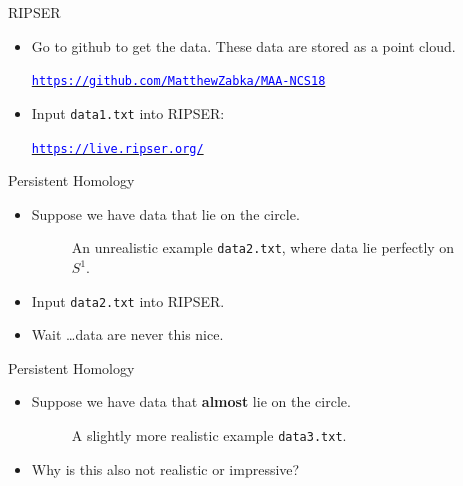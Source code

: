 \begin{frame}{RIPSER}
\begin{center}
\end{center}
\begin{itemize}
\item<1-> Go to github to get the data. These data are stored as a point cloud.
\begin{center}
\hyperref[https://github.com/MatthewZabka/MAA-NCS18]{\textcolor{blue}{\texttt{https://github.com/MatthewZabka/MAA-NCS18}}}
\end{center}
\item<2-> Input \texttt{data1.txt} into RIPSER:
\begin{center}
\hyperref[https://live.ripser.org/]{\textcolor{blue}{\texttt{https://live.ripser.org/}}}
\end{center}
\end{itemize}
\end{frame}
\begin{frame}{Persistent Homology}
\begin{itemize}
\item<1-> Suppose we have data that lie on the circle.
\begin{center}
\begin{figure}
\caption{An unrealistic example \texttt{data2.txt}, where data lie perfectly on $S^1$.}
\end{figure}
\end{center}
\item<2-> Input \texttt{data2.txt} into RIPSER.
\item<2-> Wait \ldots data are never this nice.
\end{itemize}
\end{frame}
\begin{frame}{Persistent Homology}
\begin{itemize}
\item<1-> Suppose we have data that \textbf{almost} lie on the circle.
\begin{center}
\begin{figure}
\caption{A slightly more realistic example \texttt{data3.txt}.}
\end{figure}
\end{center}
\item<2-> Why is this also not realistic or impressive?
\end{itemize}
\end{frame}
